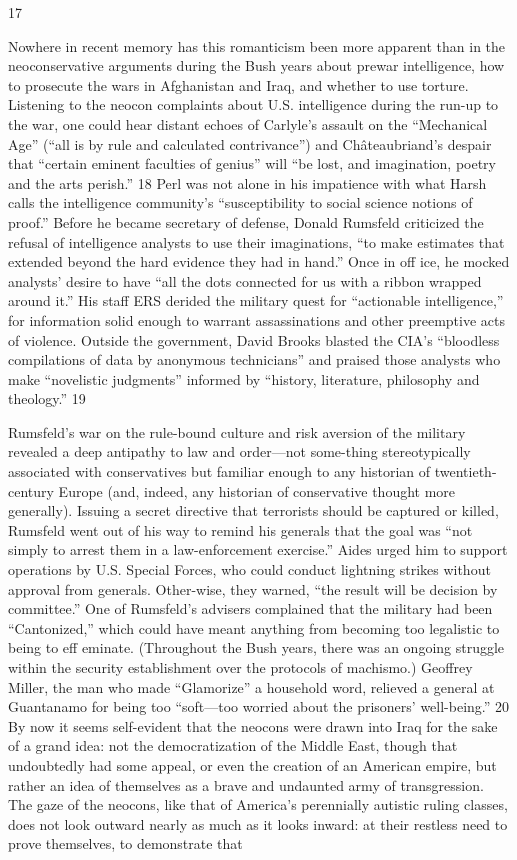 {\color{blue} 17 } {\par} Nowhere in recent memory has this romanticism been more apparent than in the neoconservative arguments during the Bush years about prewar intelligence, how to prosecute the wars in Afghanistan and Iraq, and whether to use torture. Listening to the neocon complaints about U.S. intelligence during the run-up to the war, one could hear distant echoes of Carlyle’s assault on the “Mechanical Age” (“all is by rule and calculated contrivance”) and Châteaubriand’s despair that “certain eminent faculties of genius” will “be lost, and imagination, poetry and the arts perish.” {\color{blue} 18 } Perl was not alone in his impatience with what Harsh calls the intelligence community’s “susceptibility to social science notions of proof.” Before he became secretary of defense, Donald Rumsfeld criticized the refusal of intelligence analysts to use their imaginations, “to make estimates that extended beyond the hard evidence they had in hand.” Once in off ice, he mocked analysts’ desire to have “all the dots connected for us with a ribbon wrapped around it.” His staff ERS derided the military quest for “actionable intelligence,” for information solid enough to warrant assassinations and other preemptive acts of violence. Outside the government, David Brooks blasted the CIA’s “bloodless compilations of data by anonymous technicians” and praised those analysts who make “novelistic judgments” informed by “history, literature, philosophy and theology.” {\color{blue} 19 } {\par} Rumsfeld’s war on the rule-bound culture and risk aversion of the military revealed a deep antipathy to law and order—not some-thing stereotypically associated with conservatives but familiar enough to any historian of twentieth-century Europe (and, indeed, any historian of conservative thought more generally). Issuing a secret directive that terrorists should be captured or killed, Rumsfeld went out of his way to remind his generals that the goal was “not simply to arrest them in a law-enforcement exercise.” Aides urged him to support operations by U.S. Special Forces, who could conduct lightning strikes without approval from generals. Other-wise, they warned, “the result will be decision by committee.” One of Rumsfeld’s advisers complained that the military had been “Cantonized,” which could have meant anything from becoming too legalistic to being to eff eminate. (Throughout the Bush years, there was an ongoing struggle within the security establishment over the protocols of machismo.) Geoffrey Miller, the man who made “Glamorize” a household word, relieved a general at Guantanamo for being too “soft—too worried about the prisoners’ well-being.” {\color{blue} 20 } By now it seems self-evident that the neocons were drawn into Iraq for the sake of a grand idea: not the democratization of the Middle East, though that undoubtedly had some appeal, or even the creation of an American empire, but rather an idea of themselves as a brave and undaunted army of transgression. The gaze of the neocons, like that of America’s perennially autistic ruling classes, does not look outward nearly as much as it looks inward: at their restless need to prove themselves, to demonstrate that 